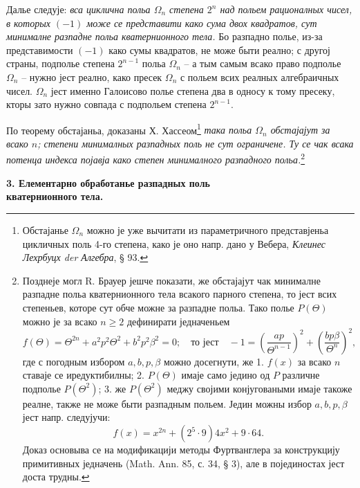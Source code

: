 ﻿\documentclass[11pt]{article}
\begin{document}
\noindent Далье следује: \emph{вса циклична польа $\Omega_n$ степена $2^n$ над польем рационалных чисел, в которых $(-1)$ може се представити како сума двох квадратов, сут минималне разпадне польа кватернионного тела.} Бо разпадно полье, из-за представимости $(-1)$ како сумы квадратов, не може быти реално; с другој страны, подполье степена $2^{n-1}$ польа $\Omega_n$ -- а тым самым всако право подполье $\Omega_n$ -- нужно јест реално, како пресек $\Omega_n$ с польем всих реалных алгебраичных чисел. $\Omega_n$ јест именно Галоисово полье степена два в односу к тому пресеку, кторы зато нужно совпада с подпольем степена $2^{n-1}$.

\medskip

\noindent По теорему обстајаньа, доказаны Х. Хассеом\footnote{Обстајанье $\Omega_n$ можно је уже вычитати из параметричного представјеньа цикличных поль 4-го степена, како је оно напр. дано у Вебера, \emph{Клеинес Лехрбуцх der Алгебра}, § 93.} \emph{така польа $\Omega_n$ обстајајут за всако $n$; степени минималных разпадных поль не сут ограничене. Ту се чак всака потенца индекса појавја како степен минималного разпадного польа.}\footnote{Позднеје могл R. Брауер јешче показати, же обстајајут чак минималне разпадне польа кватернионного тела всакого парного степена, то јест всих степеньев, которе сут обче можне за разпадне польа. Тако полье $P(\Theta)$ можно је за всако $n\ge2$ дефинирати једначеньем
\[
 f(\Theta)=\Theta^{2n}+a^2p^2\Theta^2+b^2p^2\beta^2=0;
 \quad \text{то јест}\quad -1=\left(\frac{ap}{\Theta^{n-1}}\right)^2+
       \left(\frac{bp\beta}{\Theta^n}\right)^2,
\]
где с погодным избором $a,b,p,\beta$ можно досегнути, же 1. $f(x)$ за всако $n$ ставаје се иредуктибилны; 2. $P(\Theta)$ имаје само једино од $P$ различне подполье $P(\Theta^2)$; 3. же $P(\Theta^2)$ меджу својими конјуговаными имаје такоже реалне, также не може быти разпадным польем. Једин можны избор $a,b,p,\beta$ јест напр. следујучи:
\[
        f(x)=x^{2n}+(2^5\cdot9)4x^2+9\cdot64.
\]
Доказ основыва се на модификацији методы Фуртванглера за конструкцију примитивных једначень (Math. Ann. 85, с. 34, § 3), але в појединостах јест доста трудны.}

\begin{center}
\textbf{3. Елементарно обработанье разпадных поль\\
кватернионного тела.}
\end{center}
\end{document}
